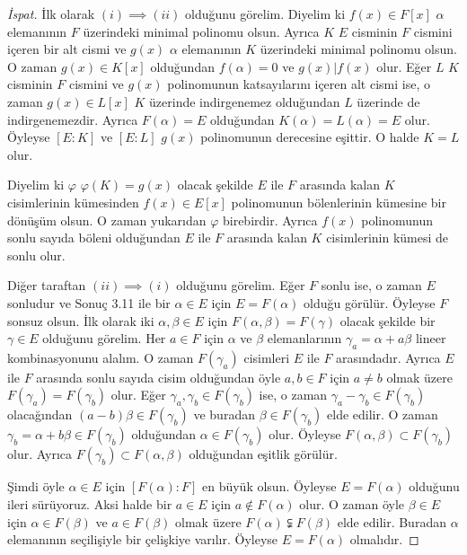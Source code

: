 \documentclass[draft]{article}
\theoremstyle{definition}
\theoremstyle{remark}
\begin{document}
    	    \begin{proof}[İspat]
    	        İlk olarak $(i) \implies (ii)$ olduğunu görelim. Diyelim ki $f(x) \in F[x]$ $\alpha$ elemanının $F$ üzerindeki minimal polinomu olsun. Ayrıca $K$ $E$ cisminin $F$ cismini içeren bir alt cismi ve $g(x)$ $\alpha$ elemanının $K$ üzerindeki minimal polinomu olsun. O zaman $g(x) \in K[x]$ olduğundan $f(\alpha) = 0$ ve $g(x) | f(x)$ olur. Eğer $L$ $K$ cisminin $F$ cismini ve $g(x)$ polinomunun katsayılarını içeren alt cismi ise, o zaman $g(x) \in L[x]$ $K$ üzerinde indirgenemez olduğundan $L$ üzerinde de indirgenemezdir. Ayrıca $F(\alpha) = E$ olduğundan $K(\alpha) = L(\alpha) = E$ olur. Öyleyse $[E : K]$ ve $[E : L]$ $g(x)$ polinomunun derecesine eşittir. O halde $K = L$ olur.\par
    	        Diyelim ki $\varphi$ $\varphi(K) = g(x)$ olacak şekilde $E$ ile $F$ arasında kalan $K$ cisimlerinin kümesinden $f(x) \in E[x]$ polinomunun bölenlerinin kümesine bir dönüşüm olsun. O zaman yukarıdan $\varphi$ birebirdir. Ayrıca $f(x)$ polinomunun sonlu sayıda böleni olduğundan $E$ ile $F$ arasında kalan $K$ cisimlerinin kümesi de sonlu olur.\par
    	        Diğer taraftan $(ii) \implies (i)$ olduğunu görelim. Eğer $F$ sonlu ise, o zaman $E$ sonludur ve Sonuç 3.11 ile bir $\alpha \in E$ için $E = F(\alpha)$ olduğu görülür. Öyleyse $F$ sonsuz olsun. İlk olarak iki $\alpha, \beta \in E$ için $F(\alpha, \beta) = F(\gamma)$ olacak şekilde bir $\gamma \in E$ olduğunu görelim. Her $a \in F$ için $\alpha$ ve $\beta$ elemanlarının $\gamma_a = \alpha + a\beta$ lineer kombinasyonunu alalım. O zaman $F(\gamma_a)$ cisimleri $E$ ile $F$ arasındadır. Ayrıca $E$ ile $F$ arasında sonlu sayıda cisim olduğundan öyle $a, b \in F$ için $a \neq b$ olmak üzere $F(\gamma_a) = F(\gamma_b)$ olur. Eğer $\gamma_a, \gamma_b \in F(\gamma_b)$ ise, o zaman $\gamma_a - \gamma_b \in F(\gamma_b)$ olacağından $(a - b)\beta \in F(\gamma_b)$ ve buradan $\beta \in F(\gamma_b)$ elde edilir. O zaman $\gamma_b = \alpha + b\beta \in F(\gamma_b)$ olduğundan $\alpha \in F(\gamma_b)$ olur. Öyleyse $F(\alpha, \beta) \subset F(\gamma_b)$ olur. Ayrıca $F(\gamma_b) \subset F(\alpha, \beta)$ olduğundan eşitlik görülür.\par
    	        Şimdi öyle $\alpha \in E$ için $[F(\alpha) : F]$ en büyük olsun. Öyleyse $E = F(\alpha)$ olduğunu ileri sürüyoruz. Aksi halde bir $a \in E$ için $a \notin F(\alpha)$ olur. O zaman öyle $\beta \in E$ için $\alpha \in F(\beta)$ ve $a \in F(\beta)$ olmak üzere $F(\alpha) \subsetneqq F(\beta)$ elde edilir. Buradan $\alpha$ elemanının seçilişiyle bir çelişkiye varılır. Öyleyse $E = F(\alpha)$ olmalıdır.
    	    \end{proof}
    	    
\end{document}
